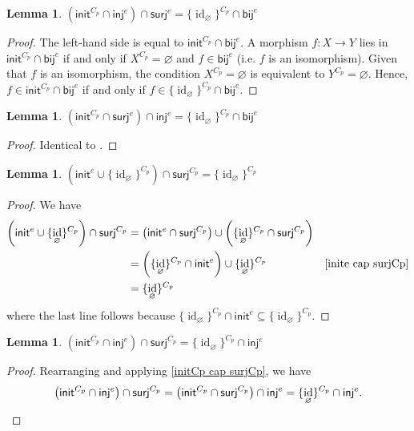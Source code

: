 \documentclass{amsart}
\renewcommand\emptyset\varnothing
\newcommand{\inj}{\mathsf{inj}}
\newcommand{\surj}{\mathsf{surj}}
\newcommand{\bij}{\mathsf{bij}}
\newcommand{\init}{\mathsf{init}}
\DeclareMathOperator{\id}{id}
\numberwithin{equation}{section}
\newtheorem{lemma}[equation]{Lemma}
\theoremstyle{definition}
\begin{document}
\begin{lemma}
	\label{(initCp cap inje) cap surje}
	$\left(\init^{C_p} \cap \inj^e\right) \cap \surj^e = \{\id_\emptyset\}^{C_p} \cap \bij^e$
\end{lemma}
\begin{proof}
	The left-hand side is equal to $\init^{C_p} \cap \bij^e$. A morphism $f : X \to Y$ lies in $\init^{C_p} \cap \bij^e$ if and only if $X^{C_p} = \emptyset$ and $f \in \bij^e$ (i.e. $f$ is an isomorphism). Given that $f$ is an isomorphism, the condition $X^{C_p} = \emptyset$ is equivalent to $Y^{C_p} = \emptyset$. Hence, $f \in \init^{C_p} \cap \bij^e$ if and only if $f \in \{\id_\emptyset\}^{C_p} \cap \bij^e$.
\end{proof}

\begin{lemma}
	\label{(initCp cap surje) cap inje}
	$\left(\init^{C_p} \cap \surj^e\right) \cap \inj^e = \{\id_\emptyset\}^{C_p} \cap \bij^e$
\end{lemma}
\begin{proof}
	Identical to .
\end{proof}

\begin{lemma}
	\label{(inite cup idemptyCp) cap surjCp}
	$\left(\init^e \cup \{\id_\emptyset\}^{C_p} \right) \cap \surj^{C_p} = \{\id_\emptyset\}^{C_p}$
\end{lemma}

\begin{proof}
	We have
	\begin{align*}
		\left(\init^e \cup \{\id_\emptyset\}^{C_p} \right) \cap \surj^{C_p}
		                                                                               & =
		\left(\init^e \cap \surj^{C_p} \right) \cup \left(\{\id_\emptyset\}^{C_p} \cap \surj^{C_p}\right)
		\\
		                                                                               & =
		\left(\{\id_\emptyset\}^{C_p} \cap \init^e\right) \cup \{\id_\emptyset\}^{C_p} & \text{\cref{inite cap surjCp}}
		\\
		                                                                               & =
		\{\id_\emptyset\}^{C_p}
	\end{align*}
	where the last line follows because $\{\id_\emptyset\}^{C_p} \cap \init^e \subseteq \{\id_\emptyset\}^{C_p}$.
\end{proof}

\begin{lemma}
	\label{(initCp cap inje) cap surjCp}
	$\left(\init^{C_p} \cap \inj^e\right) \cap \surj^{C_p} = \{\id_\emptyset\}^{C_p} \cap \inj^e$
\end{lemma}
\begin{proof}
	Rearranging and applying \cref{initCp cap surjCp}, we have \[\left(\init^{C_p} \cap \inj^e\right) \cap \surj^{C_p} = \left(\init^{C_p} \cap \surj^{C_p}\right) \cap \inj^e = \{\id_\emptyset\}^{C_p} \cap \inj^e.\qedhere\]
\end{proof}
\end{document}
